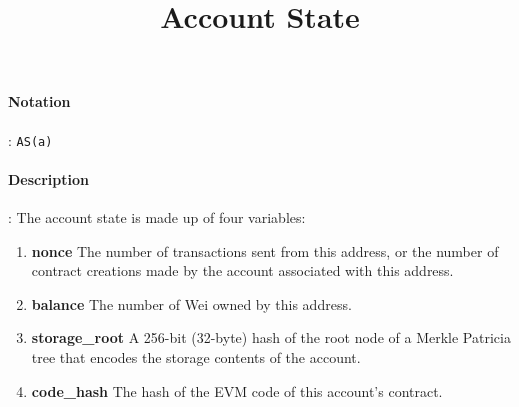 \documentclass[10pt,a4paper,oneside]{scrartcl}
\author{}
\title{Account State}
\date{}
\begin{document}
\maketitle
\paragraph{Notation}: \texttt{AS(a)}
\paragraph{Description}: The account state is made up of four variables:
\begin{enumerate}
	\item \textbf{nonce} The number of transactions sent from this address, or the number of contract creations made by the account associated with this address.
	\item \textbf{balance} The number of Wei owned by this address.
	\item \textbf{storage\_root} A 256-bit (32-byte) hash of the root node of a Merkle Patricia tree that encodes the storage contents of the account.
	\item \textbf{code\_hash} The hash of the EVM code of this account's contract.
\end{enumerate}
\end{document}
